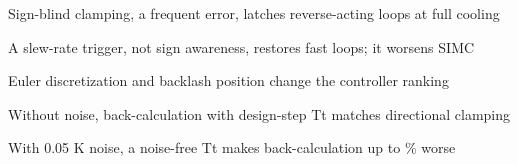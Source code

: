 \begin{highlights}
\item Sign-blind clamping, a frequent error, latches reverse-acting loops at full cooling
\item A slew-rate trigger, not sign awareness, restores fast loops; it worsens SIMC
\item Euler discretization and backlash position change the controller ranking
\item Without noise, back-calculation with design-step Tt matches directional clamping
\item With 0.05 K noise, a noise-free Tt makes back-calculation up to \vnzbchimaxpct\% worse
\end{highlights}
